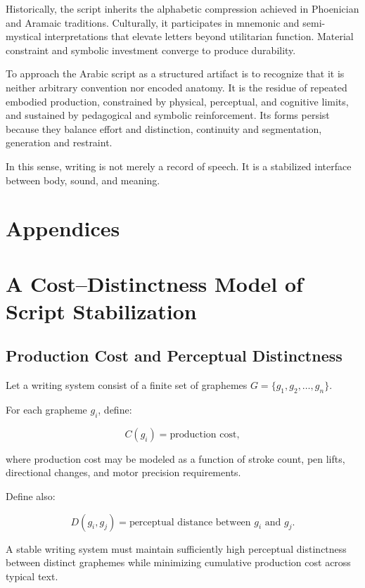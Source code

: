 \documentclass[11pt]{article}
\begin{document}
Historically, the script inherits the alphabetic compression achieved in Phoenician and Aramaic traditions. Culturally, it participates in mnemonic and semi-mystical interpretations that elevate letters beyond utilitarian function. Material constraint and symbolic investment converge to produce durability.

To approach the Arabic script as a structured artifact is to recognize that it is neither arbitrary convention nor encoded anatomy. It is the residue of repeated embodied production, constrained by physical, perceptual, and cognitive limits, and sustained by pedagogical and symbolic reinforcement. Its forms persist because they balance effort and distinction, continuity and segmentation, generation and restraint.

In this sense, writing is not merely a record of speech. It is a stabilized interface between body, sound, and meaning.

\newpage
\section*{Appendices} 

\appendix

\section{A Cost–Distinctness Model of Script Stabilization}

\subsection{Production Cost and Perceptual Distinctness}

Let a writing system consist of a finite set of graphemes $G = \{g_1, g_2, \dots, g_n\}$.

For each grapheme $g_i$, define:

\[
C(g_i) = \text{production cost},
\]

where production cost may be modeled as a function of stroke count, pen lifts, directional changes, and motor precision requirements.

Define also:

\[
D(g_i, g_j) = \text{perceptual distance between } g_i \text{ and } g_j.
\]

A stable writing system must maintain sufficiently high perceptual distinctness between distinct graphemes while minimizing cumulative production cost across typical text.
\end{document}
